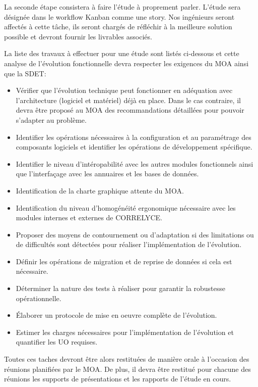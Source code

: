 	La seconde étape consistera à faire l’étude à proprement parler. L’étude sera désignée dans le workflow Kanban comme une story. Nos ingénieurs seront affectés à cette tâche, ils seront chargés de réfléchir à la meilleure solution possible et devront fournir les livrables associés. 
	
	La liste des travaux à effectuer pour une étude sont listés ci-dessous et cette analyse de l’évolution fonctionnelle devra respecter les exigences du MOA ainsi que la SDET:
	
	\begin{itemize}
		\item Vérifier que l’évolution technique peut fonctionner en adéquation avec l’architecture (logiciel et matériel) déjà en place. Dans le cas contraire, il devra être proposé au MOA des recommandations détaillées pour pouvoir s’adapter au problème.
		\item Identifier les opérations nécessaires à la configuration et au paramétrage des composants logiciels et identifier les opérations de développement spécifique.
		\item Identifier le niveau d’intéropabilité avec les autres modules fonctionnels ainsi que l’interfaçage avec les annuaires et les bases de données.
		\item Identification de la charte graphique attente du MOA.			\item Identification du niveau d’homogénéité ergonomique nécessaire avec les modules  internes et externes de CORRELYCE.
		\item Proposer des moyens de contournement ou d’adaptation si des limitations ou de difficultés sont détectées pour réaliser l’implémentation de l’évolution.
		\item Définir les opérations de migration et de reprise de données si cela est nécessaire.
		\item Déterminer la nature des tests à réaliser pour garantir la robustesse opérationnelle.
		\item Élaborer un protocole de mise en oeuvre complète de l’évolution.
		\item Estimer les charges nécessaires pour l’implémentation de l’évolution et quantifier les UO requises.
		\end{itemize}
		
	Toutes ces taches devront être alors restituées de manière orale à l’occasion des réunions planifiées par le MOA. De plus, il devra être restitué pour chacune des réunions les supports de présentations et les rapports de l’étude en cours.
	
